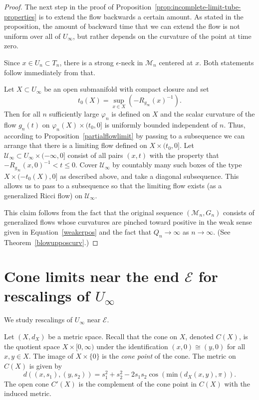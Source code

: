 \begin{proof}
The next step in the proof of Proposition~\ref{prop:incomplete-limit-tube-properties} is to extend
the flow backwards a certain amount. As stated in the proposition,
the amount of backward time that we can extend the flow is not
uniform over all of $U_\infty$, but rather depends on the curvature
of the point at time zero.



Since $x\in U_n\subset T_n$, there is a strong $\epsilon$-neck in
${\mathcal M}_n$ centered at $x$. Both statements follow immediately
from that.


Let $X\subset U_\infty$ be an open submanifold with compact closure
and set
$$t_0(X)= \sup_{x\in X}(-R_{g_\infty}(x)^{-1}).$$ Then for
all $n$ sufficiently large $\varphi_n$ is defined on $X$ and the
scalar curvature of the flow $g_n(t)$ on $\varphi_n(X)\times
(t_0,0]$ is uniformly bounded independent of $n$. Thus, according to
Proposition~\ref{partialflowlimit} by passing to a subsequence we
can arrange that there is a limiting flow defined on $X\times
(t_0,0]$. Let ${\mathcal U}_\infty\subset U_\infty\times
(-\infty,0]$ consist of all pairs $(x,t)$ with the property that
$-R_{g_\infty}(x,0)^{-1}<t\le 0$.
 Cover ${\mathcal U}_\infty$ by countably many such boxes
of the type $X\times (-t_0(X),0]$ as described above, and take a
diagonal subsequence. This allows us to pass to a subsequence so
that the limiting flow exists (as a generalized Ricci flow) on
${\mathcal U}_\infty$.



 This claim follows from the fact that the
original sequence $({\mathcal M}_n,G_n)$ consists of generalized
flows whose curvatures are pinched toward positive in the weak sense
given in Equation~\ref{weakerpos} and the fact that $Q_n\rightarrow
\infty$ as $n\rightarrow \infty$. (See Theorem~\ref{blowupposcurv}.)

\end{proof}





\section{Cone limits near the end ${\mathcal E}$ for rescalings of $U_\infty$}\label{GromHaus}

We study rescalings of $U_\infty$ near ${\mathcal E}$.

Let $(X,d_X)$ be a metric space. Recall that the  cone on $X$,
denoted $C(X)$, is the quotient space $X\times [0,\infty)$ under the
identification $(x,0)\cong (y,0)$ for all $x,y\in X$. The image of
$X\times\{0\}$ is the {\sl cone point} of the cone. The metric on
$C(X)$ is given by
\begin{equation}\label{conemetric}
d((x,s_1),(y,s_2))=s_1^2+s_2^2-2s_1s_2\cos(\mathrm{min}(d_X(x,y),\pi)). \end{equation} The open cone $C'(X)$ is the
complement of the cone point in $C(X)$ with the induced metric.


